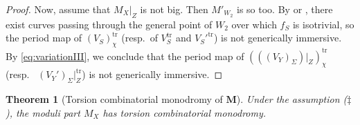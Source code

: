 \documentclass{amsart}
\newtheorem{thm}[theorem]{Theorem}
\theoremstyle{definition}
\theoremstyle{remark}
\newcommand\bfM{{\bf M}}
\def\trans{\mathrm{tr}}
\def\bfM{\mathbf{M}}
\numberwithin{equation}{section}
\begin{document}
\begin{proof}
Now, assume that $M_{X}|_Z$ is not big. Then $M'_{W_2}$ is so too. By \cite[Thm.~3.3]{Amb05} or \cite[Thm.~A.12]{PZ2020}, there exist curves passing through the general point of $W_2$ over which $f_{S}$ is isotrivial, so the period map of $(V_{S})^{\trans}_{\chi}$ (resp.~of $V_{S}^{\trans}$ and $V_{S}'^{\trans}$) is not generically immersive. By \eqref{eq:variationIII}, we conclude that the period map of $(((V_Y)_\Sigma)|_Z)^{\trans}_{\chi}$ (resp.~ $(V_Y')_\Sigma|_{Z}^{\trans}$) is not generically immersive.
\end{proof}

\begin{thm}[Torsion combinatorial monodromy of $\bfM$]\label{thm:torsion}
Under the assumption ($\ddagger$), the moduli part $M_X$ has torsion combinatorial monodromy.
\end{thm}
\end{document}
